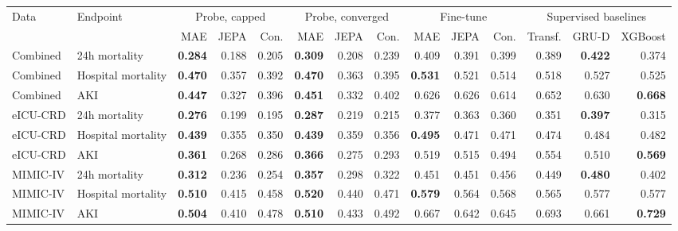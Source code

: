 \setlength{\tabcolsep}{3.6pt}
\begin{tabular}{@{}llrrrrrrrrrrrr@{}}
\toprule
Data & Endpoint & \multicolumn{3}{c}{Probe, capped} & \multicolumn{3}{c}{Probe, converged} & \multicolumn{3}{c}{Fine-tune} & \multicolumn{3}{c}{Supervised baselines} \\
\cmidrule(lr){3-5} \cmidrule(lr){6-8} \cmidrule(lr){9-11} \cmidrule(lr){12-14}
 & & MAE & JEPA & Con. & MAE & JEPA & Con. & MAE & JEPA & Con. & Transf. & GRU-D & XGBoost \\
\midrule
Combined & 24h mortality & \textbf{0.284} & 0.188 & 0.205 & \textbf{0.309} & 0.208 & 0.239 & 0.409 & 0.391 & 0.399 & 0.389 & \textbf{0.422} & 0.374 \\
Combined & Hospital mortality & \textbf{0.470} & 0.357 & 0.392 & \textbf{0.470} & 0.363 & 0.395 & \textbf{0.531} & 0.521 & 0.514 & 0.518 & 0.527 & 0.525 \\
Combined & AKI & \textbf{0.447} & 0.327 & 0.396 & \textbf{0.451} & 0.332 & 0.402 & 0.626 & 0.626 & 0.614 & 0.652 & 0.630 & \textbf{0.668} \\
eICU-CRD & 24h mortality & \textbf{0.276} & 0.199 & 0.195 & \textbf{0.287} & 0.219 & 0.215 & 0.377 & 0.363 & 0.360 & 0.351 & \textbf{0.397} & 0.315 \\
eICU-CRD & Hospital mortality & \textbf{0.439} & 0.355 & 0.350 & \textbf{0.439} & 0.359 & 0.356 & \textbf{0.495} & 0.471 & 0.471 & 0.474 & 0.484 & 0.482 \\
eICU-CRD & AKI & \textbf{0.361} & 0.268 & 0.286 & \textbf{0.366} & 0.275 & 0.293 & 0.519 & 0.515 & 0.494 & 0.554 & 0.510 & \textbf{0.569} \\
MIMIC-IV & 24h mortality & \textbf{0.312} & 0.236 & 0.254 & \textbf{0.357} & 0.298 & 0.322 & 0.451 & 0.451 & 0.456 & 0.449 & \textbf{0.480} & 0.402 \\
MIMIC-IV & Hospital mortality & \textbf{0.510} & 0.415 & 0.458 & \textbf{0.520} & 0.440 & 0.471 & \textbf{0.579} & 0.564 & 0.568 & 0.565 & 0.577 & 0.577 \\
MIMIC-IV & AKI & \textbf{0.504} & 0.410 & 0.478 & \textbf{0.510} & 0.433 & 0.492 & 0.667 & 0.642 & 0.645 & 0.693 & 0.661 & \textbf{0.729} \\
\bottomrule
\end{tabular}
